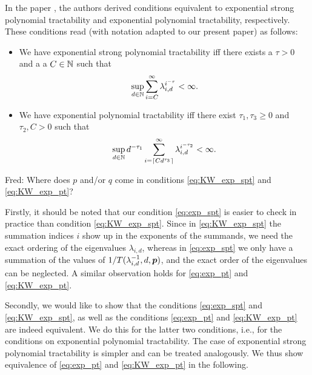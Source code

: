 \documentclass[sort&compress]{elsarticle}
\newcommand{\fred}[1]{\begingroup\color{blue}#1\endgroup}
\newcommand{\peter}[1]{\begingroup\color{violet}#1\endgroup}
\begin{document}
\peter{
In the paper \cite{KriWoz19a}, the authors derived conditions equivalent to exponential strong polynomial tractability and exponential polynomial tractability, respectively. These conditions read (with notation adapted to our present paper) as follows:
\begin{itemize}
    \item We have exponential strong polynomial tractability iff there exists a $\tau>0$ and a
    a $C\in\mathbb{N}$ such that
    \begin{equation}\label{eq:KW_exp_spt}
        \sup_{d\in\mathbb{N}} \sum_{i=C}^{\infty} \lambda_{i,d}^{i^{-\tau}} < \infty.
    \end{equation}
    \item We have exponential polynomial tractability iff there exist $\tau_1,\tau_3\ge 0$ and $\tau_2, C>0$ such that
    \begin{equation}\label{eq:KW_exp_pt}
        \sup_{d\in\mathbb{N}} d^{-\tau_1} \sum_{i=\lceil C d^{\tau_3} \rceil}^{\infty} \lambda_{i,d}^{i^{-\tau_2}} < \infty.
    \end{equation}
\end{itemize}

\fred{Fred: Where does $p$ and/or $q$ come in conditions \eqref{eq:KW_exp_spt} and \eqref{eq:KW_exp_pt}?}

Firstly, it should be noted that our condition \eqref{eq:exp_spt} is easier to check in practice than condition \eqref{eq:KW_exp_spt}. Since in \eqref{eq:KW_exp_spt} the summation indices $i$ show up in the exponents of the summands, we need the exact ordering of the eigenvalues $\lambda_{i,d}$, whereas in \eqref{eq:exp_spt} we only have a summation of the values of $1/T(\lambda_{i,d}^{-1},d,\boldsymbol{p})$, and the exact order of the eigenvalues can be neglected. A similar
observation holds for \eqref{eq:exp_pt} and \eqref{eq:KW_exp_pt}.

Secondly, we would like to show that the conditions \eqref{eq:exp_spt} and \eqref{eq:KW_exp_spt}, as well as the conditions \eqref{eq:exp_pt} and \eqref{eq:KW_exp_pt} are indeed equivalent. We do this for the latter two conditions, i.e., for the conditions on exponential polynomial tractability. The case of exponential strong polynomial tractability is simpler and can be treated analogously. We thus show equivalence of \eqref{eq:exp_pt} and \eqref{eq:KW_exp_pt} in the following.

}
\end{document}
